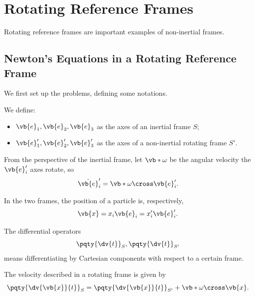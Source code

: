 \section{Rotating Reference Frames}

Rotating reference frames are important examples of non-inertial frames.

\subsection{Newton's Equations in a Rotating Reference Frame}

We first set up the problems, defining some notations.

\begin{definition}
    \label{def:rotating-frame-notation}%
    We define:
    \begin{itemize}
        \item \(\vb{e}_1, \vb{e}_2, \vb{e}_3\) as the axes of an inertial frame \(S\);
        \item  \(\vb{e}_1', \vb{e}_2', \vb{e}_3'\) as the axes of a non-inertial rotating frame \(S'\).
    \end{itemize}
    
    From the perspective of the inertial frame, let \(\vb*{\omega}\) be the angular velocity the \(\vb{e}_i'\) axes rotate, so
    \begin{equation}
        \dot{\vb{e}}_i' = \vb*{\omega} \cross \vb{e}_i'.
    \end{equation}

    In the two frames, the position of a particle is, respectively,
    \begin{equation}
        \vb{x} = x_i \vb{e}_i = x_i' \vb{e}_i'.
    \end{equation}

    The differential operators
    \begin{equation}
        \pqty{\dv{t}}_S, \pqty{\dv{t}}_{S'}
    \end{equation}
    means differentiating by Cartesian components with respect to a certain frame.
\end{definition}

\begin{proposition}
    \label{prop:velocity-rotating-frame}%
    The velocity described in a rotating frame is given by
    \begin{equation}
        \pqty{\dv{\vb{x}}{t}}_{S} = \pqty{\dv{\vb{x}}{t}}_{S'} + \vb*{\omega} \cross \vb{x}.
    \end{equation}
\end{proposition}

